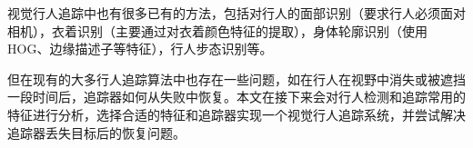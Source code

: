   视觉行人追踪中也有很多已有的方法，包括对行人的面部识别\cite{wong1995mobile,cruz2008rea}（要求行人必须面对相机），衣着识别\cite{bellotto2008multimodal,noceti2009combined}（主要通过对衣着颜色特征的提取），身体轮廓识别\cite{}（使用HOG、边缘描述子等特征），行人步态识别\cite{mowbray2003automatic,koide2016identification}等。

  但在现有的大多行人追踪算法中也存在一些问题，如在行人在视野中消失或被遮挡一段时间后，追踪器如何从失败中恢复。本文在接下来会对行人检测和追踪常用的特征进行分析，选择合适的特征和追踪器实现一个视觉行人追踪系统，并尝试解决追踪器丢失目标后的恢复问题。



